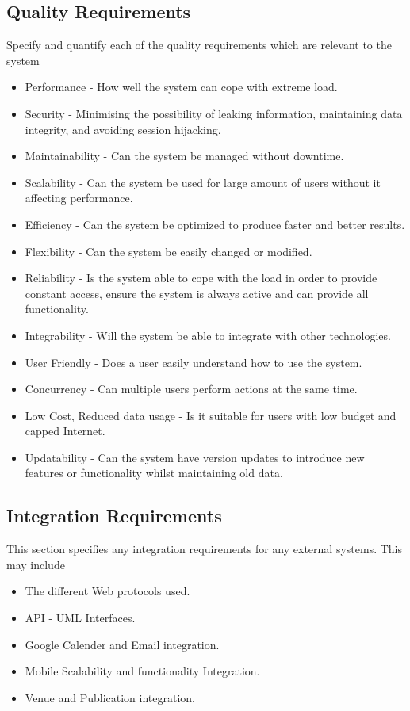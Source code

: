 \documentclass[a4paper]{article}
\begin{document}
	\subsection{Quality Requirements}
	Specify and quantify each of the quality requirements which are relevant to the system
	\begin{itemize}
		\item Performance - How well the system can cope with extreme load.
		\item Security - Minimising the possibility of leaking information, maintaining data integrity, and avoiding session hijacking.
		\item Maintainability - Can the system be managed without downtime.
		\item Scalability - Can the system be used for large amount of users without it affecting performance.
		\item Efficiency - Can the system be optimized to produce faster and better results.
		\item Flexibility - Can the system be easily changed or modified.
		\item Reliability - Is the system able to cope with the load in order to  provide constant access, ensure the system is always active and can provide all functionality.
		\item Integrability - Will the system be able to integrate with other technologies.
		\item User Friendly - Does a user easily understand how to use the system.
		\item Concurrency - Can multiple users perform actions at the same time.
		\item Low Cost, Reduced data usage - Is it suitable for users with low budget and capped Internet.
		\item Updatability - Can the system have version updates to introduce new features or functionality whilst maintaining old data.
		\\
	\end{itemize}
	
	\subsection{Integration Requirements}
	This section specifies any integration requirements for any external systems. This may include
	\begin{itemize}
		\item The different Web protocols used.
		\item API - UML Interfaces.
		\item Google Calender and Email integration.
		\item Mobile Scalability and functionality Integration.
		\item Venue and Publication integration.
		\\
	\end{itemize}
	
\end{document}
